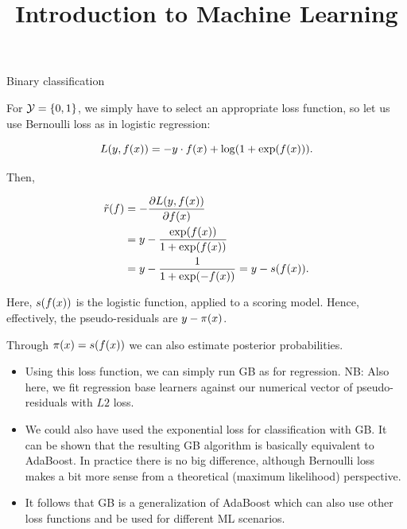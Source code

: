  






\newcommand{\titlefigure}{figure/boosting_classif_title.png}
\newcommand{\learninggoals}{
  \item Transfering gradient boosting for regression to binary classification problems
  \item Introducing gradient boosting for multiclass problems
}

\title{Introduction to Machine Learning}
\date{}





\begin{vbframe}{Binary classification}


For $\mathcal{Y} = \{0, 1\}$, we simply have to select an appropriate loss function, so let us
use Bernoulli loss as in logistic regression:

$$ L(y, f(x)) = - y \cdot f(x) + \log(1 + \exp(f(x))).$$

Then,

\vspace{-0.5cm}

\begin{align*}
\tilde{r}(f) &=-\frac{\partial L(y, f(x))}{\partial f(x)} \\
&= y - \frac{\exp(f(x))}{1 + \exp(f(x))} \\
&= y - \frac{1}{1 + \exp(-f(x))} = y - s(f(x)).
\end{align*}

Here, $s(f(x))$ is the logistic function, applied to a scoring model.
Hence, effectively, the pseudo-residuals are $y - \pi(x)$.

Through $\pi(x) = s(f(x))$ we can also estimate posterior probabilities.

\framebreak
%

\begin{itemize}
\item Using this loss function, we can simply run GB as for regression.
  NB: Also here, we fit regression base learners against our numerical 
  vector of pseudo-residuals with $L2$ loss. 
\item  We could also have used the exponential loss for classification with 
  GB. It can be shown that the resulting GB algorithm is basically equivalent 
    to AdaBoost. In practice there is no big difference, although Bernoulli loss 
    makes a bit more sense from a theoretical (maximum likelihood) perspective.
\item It follows that GB is a generalization of AdaBoost which can also use other loss functions and be used for different ML scenarios.
\end{itemize}


\end{vbframe}


